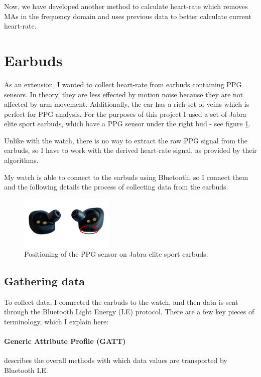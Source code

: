 \documentclass[12pt,a4paper,twoside,openright]{report}
\begin{document}
Now, we have developed another method to calculate heart-rate which
removes MAs in the frequency domain and uses previous data to better calculate
current heart-rate.

\section{Earbuds}

As an extension, I wanted to collect heart-rate from earbuds containing PPG
sensors. In theory, they 
are less effected by motion noise
because they are not affected by arm movement. Additionally, the ear has a rich set
of veins which is perfect for PPG analysis. For the purposes of this project I used
a set of Jabra elite sport earbuds, which have a PPG sensor under the right
bud - see figure \ref{fig:jabra}. 

Unlike with the watch, there is no way to extract the raw PPG signal from the
earbuds, so I have to work with the derived heart-rate signal, as provided by
their algorithms. 

My watch is able to connect to the earbuds using Bluetooth, so I connect them
and
the following details the process of collecting data from the earbuds. 

\begin{figure}[tbh]
	\centerline{\includegraphics[width=0.4\textwidth]{figs/jabra.png}}
	\caption{Positioning of the PPG sensor on Jabra elite sport earbuds.}
	\label{fig:jabra}
\end{figure}

\subsection{Gathering data}

To collect data, I connected the earbuds to the watch, and then data is
sent through the Bluetooth Light Energy (LE) protocol. There are a few key
pieces of terminology, which I explain here:

\paragraph{Generic Attribute Profile (GATT)} describes the overall methods
with which data values are transported by Bluetooth LE.
\end{document}

